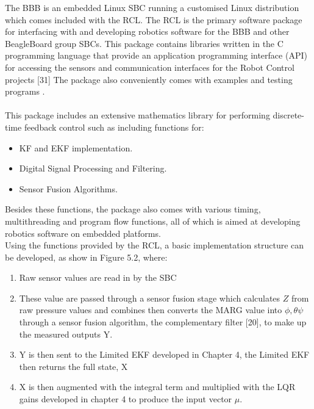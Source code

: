 \documentclass[12pt,a4paper,twoside]{report}
\begin{document}
				The BBB is an embedded Linux SBC running a customised Linux distribution which comes included with the RCL. The RCL is the primary software package for interfacing with and developing robotics software for the BBB and other BeagleBoard group SBCs. This package contains libraries written in the C programming language that provide an application programming interface (API) for accessing the sensors and communication interfaces for the Robot Control projects [31] The package also conveniently comes with examples and testing programs . 
				\\ \\
				This package includes an extensive mathematics library for performing discrete-time feedback control such as including functions for:
				
				\begin{itemize}
					\item
						KF and EKF implementation.
					\item
						Digital Signal Processing and Filtering.
					\item
						Sensor Fusion Algorithms.
				\end{itemize}  
		
				Besides these functions, the package also comes with various timing, multithreading and program flow functions, all of which is aimed at developing robotics software on embedded platforms.
				\\
				Using the functions provided by the RCL, a basic implementation structure can be developed, as show in Figure 5.2, where:
				\\
				\begin{enumerate}
					\item 
						Raw sensor values are read in by the SBC
					\item 
						These value are passed through a sensor fusion stage which calculates $Z$ from raw pressure values and combines then converts the MARG value into $\phi,\theta\psi$ through a sensor fusion algorithm, the complementary filter [20], to make up the measured outputs Y.
					\item 
						Y is then sent to the Limited EKF developed in Chapter 4, the Limited EKF then returns the full state, X
					\item 
						X is then augmented with the integral term and multiplied with the LQR gains developed in chapter 4 to produce the input vector $\mu$.
				\end{enumerate}
			
\end{document}

